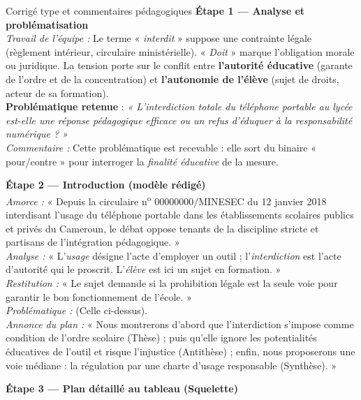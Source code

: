 \documentclass[11pt]{article}
\newcounter{popsec}
\newcounter{popsub}
\newcommand{\courssub}[1]{%
  \stepcounter{popsub}%
  \par\vspace{9pt}\noindent{\popxbold\fontsize{11.5}{13}\selectfont\color{popink}{\color{poporange}\thepopsec.\thepopsub}\hspace{6pt}#1}\par\nopagebreak\vspace{4pt}
}
\begin{document}
\courssub{Démarche et corrigé commenté}
\begin{exoresolu}{Corrigé type et commentaires pédagogiques}
\textbf{Étape 1 — Analyse et problématisation}\\
\textit{Travail de l'équipe :} Le terme « \emph{interdit} » suppose une contrainte légale (règlement intérieur, circulaire ministérielle). « \emph{Doit} » marque l'obligation morale ou juridique. La tension porte sur le conflit entre \textbf{l'autorité éducative} (garante de l'ordre et de la concentration) et \textbf{l'autonomie de l'élève} (sujet de droits, acteur de sa formation).
\\ \textbf{Problématique retenue} : \emph{« L'interdiction totale du téléphone portable au lycée est-elle une réponse pédagogique efficace ou un refus d'éduquer à la responsabilité numérique ? »}
\\ \textit{Commentaire :} Cette problématique est recevable : elle sort du binaire « pour/contre » pour interroger la \emph{finalité éducative} de la mesure.

\textbf{Étape 2 — Introduction (modèle rédigé)}\\
\textit{Amorce :} « Depuis la circulaire n\textsuperscript{o} 00000000/MINESEC du 12 janvier 2018 interdisant l'usage du téléphone portable dans les établissements scolaires publics et privés du Cameroun, le débat oppose tenants de la discipline stricte et partisans de l'intégration pédagogique. »\\
\textit{Analyse :} « L'\emph{usage} désigne l'acte d'employer un outil ; l'\emph{interdiction} est l'acte d'autorité qui le proscrit. L'\emph{élève} est ici un sujet en formation. »\\
\textit{Restitution :} « Le sujet demande si la prohibition légale est la seule voie pour garantir le bon fonctionnement de l'école. »\\
\textit{Problématique :} (Celle ci-dessus).\\
\textit{Annonce du plan :} « Nous montrerons d'abord que l'interdiction s'impose comme condition de l'ordre scolaire (Thèse) ; puis qu'elle ignore les potentialités éducatives de l'outil et risque l'injustice (Antithèse) ; enfin, nous proposerons une voie médiane : la régulation par une charte d'usage responsable (Synthèse). »

\textbf{Étape 3 — Plan détaillé au tableau (Squelette)}


\end{exoresolu}
\end{document}
